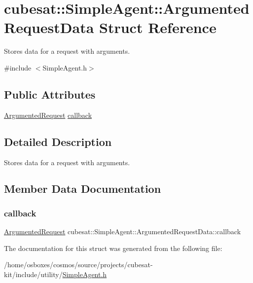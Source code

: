 \hypertarget{structcubesat_1_1SimpleAgent_1_1ArgumentedRequestData}{}\section{cubesat\+:\+:Simple\+Agent\+:\+:Argumented\+Request\+Data Struct Reference}
\label{structcubesat_1_1SimpleAgent_1_1ArgumentedRequestData}


Stores data for a request with arguments.  




{\ttfamily \#include $<$Simple\+Agent.\+h$>$}

\subsection*{Public Attributes}
\begin{DoxyCompactItemize}
\item 
\hyperlink{namespacecubesat_a4fb5bf4788a49408c2c979bb82ae4fe1}{Argumented\+Request} \hyperlink{structcubesat_1_1SimpleAgent_1_1ArgumentedRequestData_a5a0f01a14de16fc318825f9d389818f8}{callback}
\end{DoxyCompactItemize}


\subsection{Detailed Description}
Stores data for a request with arguments. 

\subsection{Member Data Documentation}
\mbox{\label{structcubesat_1_1SimpleAgent_1_1ArgumentedRequestData_a5a0f01a14de16fc318825f9d389818f8}} 
\subsubsection{\texorpdfstring{callback}{callback}}
{\footnotesize\ttfamily \hyperlink{namespacecubesat_a4fb5bf4788a49408c2c979bb82ae4fe1}{Argumented\+Request} cubesat\+::\+Simple\+Agent\+::\+Argumented\+Request\+Data\+::callback}



The documentation for this struct was generated from the following file\+:\begin{DoxyCompactItemize}
\item 
/home/osboxes/cosmos/source/projects/cubesat-\/kit/include/utility/\hyperlink{SimpleAgent_8h}{Simple\+Agent.\+h}\end{DoxyCompactItemize}
